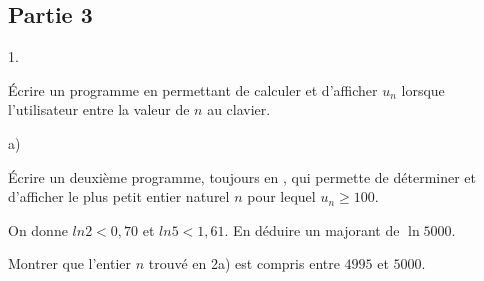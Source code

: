 \documentclass[11pt]{article}%
\begin{document}
\subsection*{Partie 3}

\begin{noliste}{1.}
 \setlength{\itemsep}{4mm}
\item Écrire un programme en \Scilab{} permettant de calculer et
d'afficher $u_{n}$ lorsque l'utilisateur entre la valeur de $n$ au
clavier.

\item 

\begin{noliste}{a)}
 \setlength{\itemsep}{2mm}
\item Écrire un deuxième programme, toujours en \Scilab{}, qui permette
de déterminer et d'afficher le plus petit entier naturel $n$ pour
lequel $u_{n}\geq 100$.

\item On donne $ln2<0,70$ et $ln5<1,61$. En déduire un majorant de $\ln
5000$.

\item Montrer que l'entier $n$ trouvé en 2a) est compris entre $4995$
et $5000$.
\end{noliste}
\end{noliste}

\label{fin}
\end{document}
